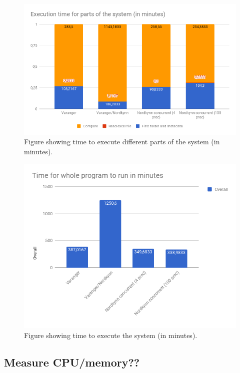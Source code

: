 \documentclass[USenglish]{uit-thesis}
\begin{document}
\begin{figure}
\centering
\includegraphics[width=\textwidth]{chart2.png}
\caption{Figure showing time to execute different parts of the system (in minutes).}
\label{fig:time_chart2}
\end{figure}

\begin{figure}
\centering
\includegraphics[width=\textwidth]{chart3.png}
\caption{Figure showing time to execute the system (in minutes).}
\label{fig:time_chart3}
\end{figure}


\subsection{Measure CPU/memory??}
\end{document}
